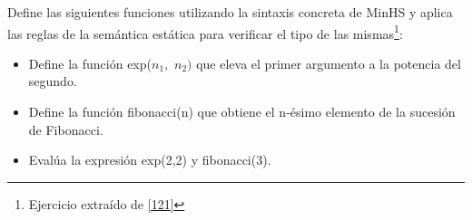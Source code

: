 \bigskip

    \begin{exercise}
        Define las siguientes funciones utilizando la sintaxis concreta de \textsf{MinHS} y aplica las reglas de la semántica estática para verificar el tipo de las mismas\footnote{Ejercicio extraído de \hyperlink{121}{[121]}}:\\
        \begin{itemize}
            \item Define la función \textsf{exp}($n_1, $ $n_2)$ que eleva el primer argumento a la potencia del segundo.
            \item Define la función \textsf{fibonacci}(n) que obtiene el n-ésimo elemento de la sucesión de Fibonacci.
            \item Evalúa la expresión \textsf{exp}(2,2) y \textsf{fibonacci}(3).
        \end{itemize}
    \end{exercise}

\bigskip



